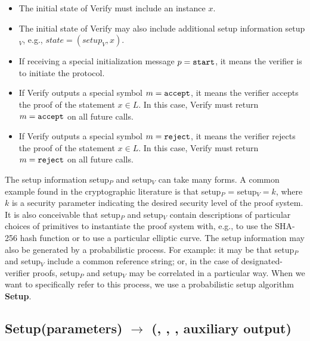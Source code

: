 \begin{itemize}
\item The initial state of Verify must include an instance $x$.
\item The initial state of Verify may also include additional setup information setup$_V$, e.g., $state = (setup_V,x)$.
\item If receiving a special initialization message $p = \tt start$, it means the verifier is to initiate the protocol.
\item If Verify outputs a special symbol $m = \tt accept$, it means the verifier accepts the proof of the statement $x \in L$. 
			In this case, Verify must return $m = \tt accept$ on all future calls.
\item If Verify outputs a special symbol $m = \tt reject$, it means the verifier rejects the proof of the statement $x \in L$. 
			In this case, Verify must return $m = \tt reject$ on all future calls.
\end{itemize}
 
	The setup information setup$_P$ and setup$_V$ can take many forms. 
	A common example found in the cryptographic literature is that setup$_P$ = setup$_V = k$, 
where $k$ is a security parameter indicating the desired security level of the proof system. 
	It is also conceivable that setup$_P$ and setup$_V$ contain descriptions of particular choices of primitives to instantiate the proof system with, e.g., to use the SHA-256 hash function or to use a particular elliptic curve. 
	The setup information may also be generated by a probabilistic process.
	For example: it may be that setup$_P$ and setup$_V$ include a common reference string; or, 
in the case of designated-verifier proofs, setup$_P$ and setup$_V$ may be correlated in a particular way. 
	When we want to specifically refer to this process, we use a probabilistic setup algorithm \textbf{Setup}.


\subsection[Setup]{\textbf{Setup}(parameters) 
$\rightarrow$ (\setR, \setP, \setV, auxiliary output)}
\label{security:syntax:setup}

